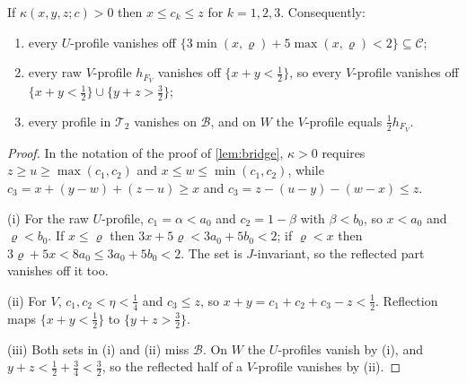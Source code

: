\documentclass[11pt,colorlinks]{charlie}
\begin{document}
\begin{lemma}[Dominance]\label{lem:dominance}
If $\kappa(x,y,z;c)>0$ then $x\le c_k\le z$ for $k=1,2,3$. Consequently:
\begin{enumerate}[label=\textup{(\roman*)}]
\item every $U$-profile vanishes off $\{3\min(x,\varrho)+5\max(x,\varrho)<2\}\subseteq\mathcal C$;
\item every raw $V$-profile $h_{F_V}$ vanishes off $\{x+y<\frac12\}$, so every $V$-profile vanishes off $\{x+y<\frac12\}\cup\{y+z>\frac32\}$;
\item every profile in $\mathcal T_2$ vanishes on $\mathcal B$, and on $W$ the $V$-profile equals $\frac12h_{F_V}$.
\end{enumerate}
\end{lemma}
\begin{proof}
In the notation of the proof of \cref{lem:bridge}, $\kappa>0$ requires $z\ge u\ge\max(c_1,c_2)$ and $x\le w\le\min(c_1,c_2)$, while $c_3=x+(y-w)+(z-u)\ge x$ and $c_3=z-(u-y)-(w-x)\le z$.

(i) For the raw $U$-profile, $c_1=\alpha<a_0$ and $c_2=1-\beta$ with $\beta<b_0$, so $x<a_0$ and $\varrho<b_0$. If $x\le\varrho$ then $3x+5\varrho<3a_0+5b_0<2$; if $\varrho<x$ then $3\varrho+5x<8a_0\le3a_0+5b_0<2$. The set is $J$-invariant, so the reflected part vanishes off it too.

(ii) For $V$, $c_1,c_2<\eta<\frac14$ and $c_3\le z$, so $x+y=c_1+c_2+c_3-z<\frac12$. Reflection maps $\{x+y<\frac12\}$ to $\{y+z>\frac32\}$.

(iii) Both sets in (i) and (ii) miss $\mathcal B$. On $W$ the $U$-profiles vanish by (i), and $y+z<\frac12+\frac34<\frac32$, so the reflected half of a $V$-profile vanishes by (ii).
\end{proof}
\end{document}
